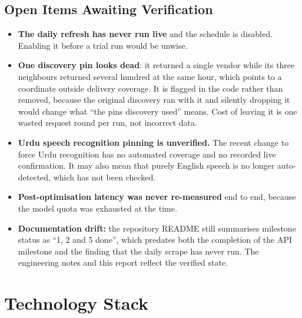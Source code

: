 \documentclass[11pt,a4paper]{article}
\begin{document}
\subsection{Open Items Awaiting Verification}

\begin{itemize}[itemsep=3pt,topsep=4pt]
\item \textbf{The daily refresh has never run live} and the schedule is
      disabled. Enabling it before a trial run would be unwise.
\item \textbf{One discovery pin looks dead}: it returned a single vendor while
      its three neighbours returned several hundred at the same hour, which
      points to a coordinate outside delivery coverage. It is flagged in the
      code rather than removed, because the original discovery ran with it and
      silently dropping it would change what ``the pins discovery used'' means.
      Cost of leaving it is one wasted request round per run, not incorrect
      data.
\item \textbf{Urdu speech recognition pinning is unverified.} The recent change
      to force Urdu recognition has no automated coverage and no recorded live
      confirmation. It may also mean that purely English speech is no longer
      auto-detected, which has not been checked.
\item \textbf{Post-optimisation latency was never re-measured} end to end,
      because the model quota was exhausted at the time.
\item \textbf{Documentation drift:} the repository README still summarises
      milestone status as ``1, 2 and 5 done'', which predates both the
      completion of the API milestone and the finding that the daily scrape has
      never run. The engineering notes and this report reflect the verified
      state.
\end{itemize}

\section{Technology Stack}
\end{document}
